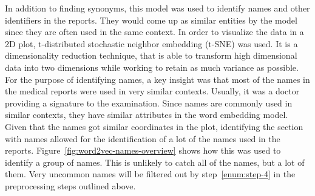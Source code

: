 In addition to finding synonyms, this model was used to identify names and other identifiers in the reports.
They would come up as similar entities by the model since they are often used in the same context.
In order to visualize the data in a 2D plot, t-distributed stochastic neighbor embedding (t-SNE) was used.
It is a dimensionality reduction technique, that is able to transform high dimensional data into two dimensions while working to retain as much variance as possible.
For the purpose of identifying names, a key insight was that most of the names in the medical reports were used in very similar contexts.
Usually, it was a doctor providing a signature to the examination.
Since names are commonly used in similar contexts, they have similar attributes in the word embedding model.
Given that the names got similar coordinates in the plot, identifying the section with names allowed for the identification of a lot of the names used in the reports.
Figure~\ref{fig:word2vec-names-overview} shows how this was used to identify a group of names.
This is unlikely to catch all of the names, but a lot of them.
Very uncommon names will be filtered out by step~\ref{enum:step-4} in the preprocessing steps outlined above.

